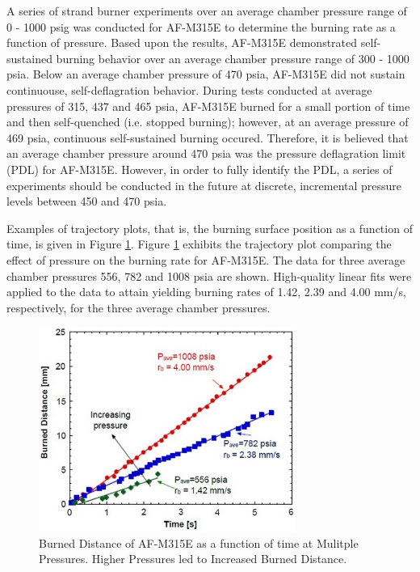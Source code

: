 \documentclass{article}
\begin{document}
A series of strand burner experiments over an average chamber pressure range of 0 - 1000 psig was conducted for 
AF-M315E to determine the burning rate as a function of pressure. Based upon the results, AF-M315E demonstrated
self-sustained burning behavior over an average chamber pressure range of 300 - 1000 psia. Below an average 
chamber pressure of 470 psia, AF-M315E did not sustain continuouse, self-deflagration behavior. During tests
conducted at average pressures of 315, 437 and 465 psia, AF-M315E burned for a small portion of time and then
self-quenched (i.e. stopped burning); however, at an average pressure of 469 psia, continuous self-sustained
burning occured. Therefore, it is believed that an average chamber pressure around 470 psia was the pressure
deflagration limit (PDL) for AF-M315E. However, in order to fully identify the PDL, a series of experiments 
should be conducted in the future at discrete, incremental pressure levels between 450 and 470 psia.

Examples of trajectory plots, that is, the burning surface position as a function of time, is given in Figure
\ref{fig6}. Figure \ref{fig6} exhibits the trajectory plot comparing the effect of pressure on the burning rate
for AF-M315E. The data for three average chamber pressures 556, 782 and 1008 psia are shown. High-quality linear
fits were applied to the data to attain yielding burning rates of 1.42, 2.39 and 4.00 mm/s, respectively, for
the three average chamber pressures.

\begin{figure}[htb]
\centering
\includegraphics[width=0.75\textwidth]{Figure_6.jpg}
\caption{Burned Distance of AF-M315E as a function of time at Mulitple Pressures. Higher Pressures led to Increased Burned Distance.}
\label{fig6}
\end{figure}
\end{document}
